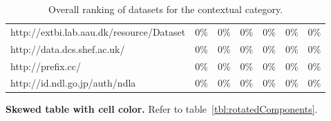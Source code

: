 \documentclass{sig-alternate-05-2015}
\begin{document}
\begin{table}[]
\begin{tabular}{lcccccc}
\multicolumn{1}{l|}{http://extbi.lab.aau.dk/resource/Dataset} & \multicolumn{1}{c|}{0\%}               & \multicolumn{1}{c|}{0\%}         & \multicolumn{1}{c|}{0\%}         & \multicolumn{1}{c|}{0\%}         & \multicolumn{1}{c|}{0\%}         & 0\%         \\
\multicolumn{1}{l|}{http://data.dcs.shef.ac.uk/}              & \multicolumn{1}{c|}{0\%}               & \multicolumn{1}{c|}{0\%}         & \multicolumn{1}{c|}{0\%}         & \multicolumn{1}{c|}{0\%}         & \multicolumn{1}{c|}{0\%}         & 0\%         \\
\multicolumn{1}{l|}{http://prefix.cc/}                        & \multicolumn{1}{c|}{0\%}               & \multicolumn{1}{c|}{0\%}         & \multicolumn{1}{c|}{0\%}         & \multicolumn{1}{c|}{0\%}         & \multicolumn{1}{c|}{0\%}         & 0\%         \\
\multicolumn{1}{l|}{http://id.ndl.go.jp/auth/ndla}            & \multicolumn{1}{c|}{0\%}               & \multicolumn{1}{c|}{0\%}         & \multicolumn{1}{c|}{0\%}         & \multicolumn{1}{c|}{0\%}         & \multicolumn{1}{c|}{0\%}         & 0\%    \\ \hline
\end{tabular}
\caption{Overall ranking of datasets for the contextual category.}
\label{tbl:tb5ContextualOverall}
\end{table}


\textbf{Skewed table with cell color.} Refer to table~\ref{tbl:rotatedComponents}.
\end{document}
